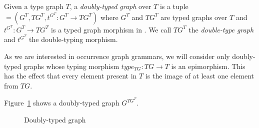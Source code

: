 \begin{definition} Given a type graph $T$, a \emph{doubly-typed graph} \doublyTypedGraph{} over $T$ is a tuple \doublyTypedGraph $= \left(G^T,TG^T, t^{G^T} : G^T \rightarrow TG^T\right)$ where $G^T$ and $TG^T$ are typed graphs over $T$ and \mbox{$t^{G^T} : G^T \rightarrow TG^T$} is a typed graph morphism in \typedGraphCategory{}. We call $TG^T$ the \emph{double-type graph} and $t^{G^T}$ the double-typing morphism.
\end{definition}

\begin{remark} As we are interested in occurrence graph grammars, we will consider only doubly-typed graphs whose typing morphism $type_{TG} : TG \rightarrow T$ is an epimorphism. This has the effect that every element present in $T$ is the image of at least one element from $TG$.
\end{remark}

\begin{example} Figure~\ref{fig:process:doubly-typed-graph} shows a doubly-typed graph $G^{TG^T}$.
\end{example}

\begin{figure}[!ht]
  \centering
  \caption{Doubly-typed graph}\label{fig:process:doubly-typed-graph}
\end{figure}

